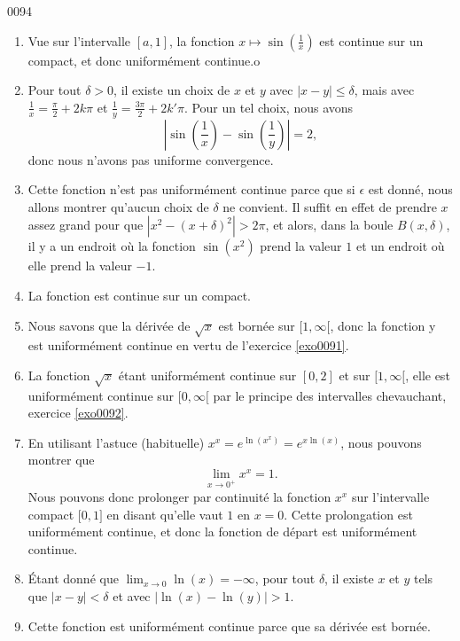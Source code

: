 \begin{corrige}{0094}
\begin{enumerate}
Notez que cet argument ne tient pas si on se limite à regarder la fonction $x^2$ sur un domaine borné.

\item
Vue sur l'intervalle $[a,1]$, la fonction $x\mapsto\sin(\frac{1}{ x })$ est continue sur un compact, et donc uniformément continue.o

\item
Pour tout $\delta>0$, il existe un choix de $x$ et $y$ avec $| x-y |\leq\delta$, mais avec $\frac{1}{ x }=\frac{ \pi }{ 2 }+2k\pi$ et $\frac{1}{ y }=\frac{ 3\pi }{2}+2k'\pi$. Pour un tel choix, nous avons
\begin{equation}
	\left| \sin(\frac{1}{ x })-\sin(\frac{1}{ y }) \right| =2,
\end{equation}
donc nous n'avons pas uniforme convergence.

\item
Cette fonction n'est pas uniformément continue parce que si $\epsilon$ est donné, nous allons montrer qu'aucun choix de $\delta$ ne convient. Il suffit en effet de prendre $x$ assez grand pour que $| x^2-(x+\delta)^2 |>2\pi$, et alors, dans la boule $B(x,\delta)$, il y a un endroit où la fonction $\sin(x^2)$ prend la valeur $1$ et un endroit où elle prend la valeur $-1$.

\item
La fonction est continue sur un compact.

\item
 Nous savons que la dérivée de $\sqrt{x}$ est bornée sur $\mathopen[1,\infty[$, donc la fonction y est uniformément continue en vertu de l'exercice \ref{exo0091}.

\item
La fonction $\sqrt{x}$ étant uniformément continue sur $[0,2]$ et sur $\mathopen[1,\infty[$, elle est uniformément continue sur $\mathopen[0,\infty[$ par le principe des intervalles chevauchant, exercice \ref{exo0092}.

\item
En utilisant l'astuce (habituelle) $x^x= e^{\ln(x^x)}= e^{x\ln(x)}$, nous pouvons montrer que
\begin{equation}
	\lim_{x\to 0^+} x^x=1.
\end{equation}
Nous pouvons donc prolonger par continuité la fonction $x^x$ sur l'intervalle compact $\mathopen[0,1\mathclose]$ en disant qu'elle vaut $1$ en $x=0$. Cette prolongation est uniformément continue, et donc la fonction de départ est uniformément continue.

\item
Étant donné que $\lim_{x\to 0}\ln(x)=-\infty$, pour tout $\delta$, il existe $x$ et $y$ tels que $| x-y |<\delta$ et avec $| \ln(x)-\ln(y) |>1$.

\item
Cette fonction est uniformément continue parce que sa dérivée est bornée.

\end{enumerate}

\end{corrige}
